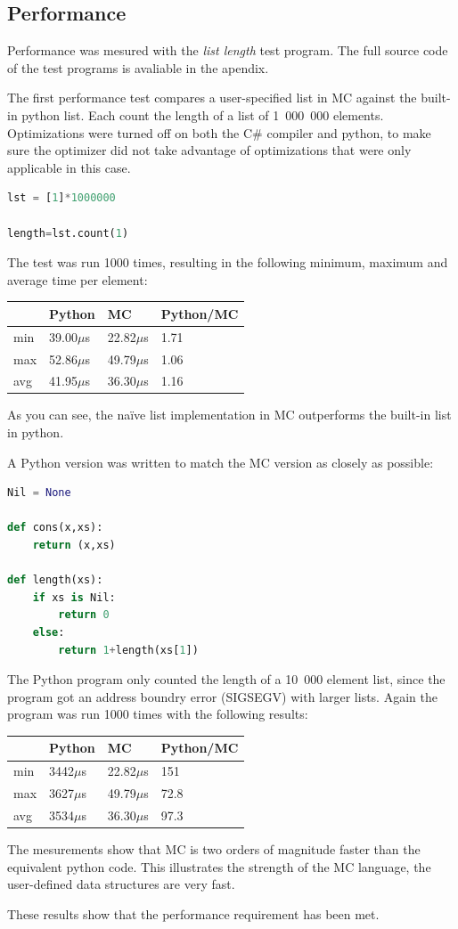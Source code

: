 \subsection{Performance}

Performance was mesured with the \textit{list length} test program.
The full source code of the test programs is avaliable in the apendix.

The first performance test compares a user-specified list in MC against the built-in python list.
Each count the length of a list of 1~000~000 elements.
Optimizations were turned off on both the C\# compiler and python, to make sure the optimizer did not take advantage of optimizations that were only applicable in this case.

\begin{lstlisting}[language=python]
lst = [1]*1000000

length=lst.count(1)
\end{lstlisting}

The test was run 1000 times, resulting in the following minimum, maximum and average time per element:

\begin{tabular}{l|lll}
& Python & MC & Python/MC \\
\hline
min & 39.00$\mu$s & 22.82$\mu$s & 1.71 \\
max & 52.86$\mu$s & 49.79$\mu$s & 1.06 \\
avg & 41.95$\mu$s & 36.30$\mu$s & 1.16 \\
\end{tabular}

As you can see, the naïve list implementation in MC outperforms the built-in list in python.

A Python version was written to match the MC version as closely as possible:

\begin{lstlisting}[language=python]
Nil = None

def cons(x,xs):
    return (x,xs)

def length(xs):
    if xs is Nil:
        return 0
    else:
        return 1+length(xs[1])
\end{lstlisting}

The Python program only counted the length of a 10~000 element list, since the program got an address boundry error (SIGSEGV) with larger lists.
Again the program was run 1000 times with the following results:

\begin{tabular}{l|lll}
& Python & MC & Python/MC \\
\hline
min & 3442$\mu$s & 22.82$\mu$s & 151  \\
max & 3627$\mu$s & 49.79$\mu$s & 72.8 \\
avg & 3534$\mu$s & 36.30$\mu$s & 97.3 \\
\end{tabular}

The mesurements show that MC is two orders of magnitude faster than the equivalent python code.
This illustrates the strength of the MC language, the user-defined data structures are very fast.

These results show that the performance requirement has been met.
